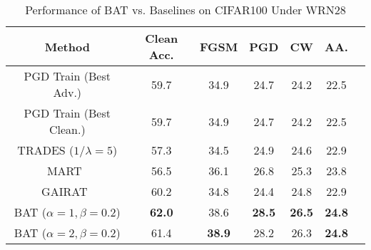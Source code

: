\begin{table}[h]
\small
\centering
\caption{Performance of BAT vs. Baselines on CIFAR100 Under WRN28}
\label{tab:wrn28_cifar100}
\begin{tabular}{c|c|ccccc}
\hline
Method & Clean Acc. & FGSM & PGD & CW & AA. \\
\hline
\hline
PGD Train (Best Adv.) & 59.7 & 34.9 & 24.7 & 24.2 & 22.5 \\
PGD Train (Best Clean.) & 59.7 & 34.9 & 24.7 & 24.2 & 22.5 \\
TRADES ($1/\lambda = 5$) & 57.3 & 34.5 & 24.9 & 24.6 & 22.9 \\
MART~\cite{wang2019improving} & 56.5 & 36.1 & 26.8 & 25.3 & 23.8 \\
GAIRAT~\cite{zhang2020geometry} & 60.2 & 34.8 & 24.4 & 24.8 & 22.9 \\
\hline
BAT ($\alpha = 1, \beta = 0.2$) & \textbf{62.0} & 38.6 & \textbf{28.5} & \textbf{26.5} & \textbf{24.8} \\
BAT ($\alpha = 2, \beta = 0.2$) & 61.4 & \textbf{38.9} & 28.2 & 26.3 & \textbf{24.8} \\
\hline
\hline
\end{tabular}
\end{table}

